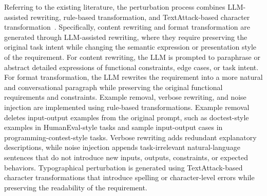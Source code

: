 Referring to the existing literature, the perturbation process combines LLM-assisted rewriting, rule-based transformation, and TextAttack-based character transformation~\cite{morris2020textattack}. Specifically, content rewriting and format transformation are generated through LLM-assisted rewriting, where they require preserving the original task intent while changing the semantic expression or presentation style of the requirement. For content rewriting, the LLM is prompted to paraphrase or abstract detailed expressions of functional constraints, edge cases, or task intent. For format transformation, the LLM rewrites the requirement into a more natural and conversational paragraph while preserving the original functional requirements and constraints. Example removal, verbose rewriting, and noise injection are implemented using rule-based transformations. Example removal deletes input-output examples from the original prompt, such as doctest-style examples in HumanEval-style tasks and sample input-output cases in programming-contest-style tasks. Verbose rewriting adds redundant explanatory descriptions, while noise injection appends task-irrelevant natural-language sentences that do not introduce new inputs, outputs, constraints, or expected behaviors. Typographical perturbation is generated using TextAttack-based character transformations that introduce spelling or character-level errors while preserving the readability of the requirement. %

